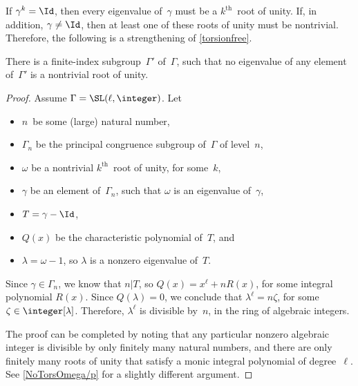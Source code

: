 If $\gamma^k = \Id$, then every eigenvalue of~$\gamma$
must be a $k^{\text{th}}$~root of unity. If, in addition,
$\gamma \neq \Id$, then at least one of these roots of
unity must be nontrivial. Therefore, the following is a
strengthening of \cref{torsionfree}. 

\begin{thm} \label{weaklynet}
 There is a finite-index subgroup\/~$\Gamma'$ of\/~$\Gamma$,
such that no eigenvalue of any element of\/~$\Gamma'$ is a
nontrivial root of unity.
 \end{thm}

\begin{proof}
 Assume $\Gamma = \SL(\ell,\integer)$. Let
 \begin{itemize}
 \item $n$~be some (large) natural number, 
 \item $\Gamma_n$ be the principal congruence subgroup
of~$\Gamma$ of level~$n$,
 \item $\omega$ be a nontrivial $k^{\text{th}}$~root of
unity, for some~$k$,
 \item $\gamma$ be an element of~$\Gamma_n$, such that
$\omega$ is an eigenvalue of~$\gamma$,
 \item $T = \gamma - \Id$, 
 \item $Q(x)$ be the characteristic polynomial of~$T$, and
 \item $\lambda = \omega - 1$, so $\lambda$ is a nonzero
eigenvalue of~$T$.
 \end{itemize}

Since $\gamma \in \Gamma_n$, we know that $n|T$, so $Q(x)
= x^\ell + n R(x)$, for some integral polynomial $R(x)$.
Since $Q(\lambda) = 0$, we conclude that $\lambda^\ell = n
\zeta$, for some $\zeta \in \integer[\lambda]$. Therefore,
$\lambda^\ell$ is divisible by~$n$, in the ring of
algebraic integers.

The proof can be completed by noting that any particular
nonzero algebraic integer is divisible by only finitely
many natural numbers, and there are only finitely many
roots of unity that satisfy a monic integral polynomial of
degree~$\ell$. See \cref{NoTorsOmega/p} for a slightly
different argument.
 \end{proof}

